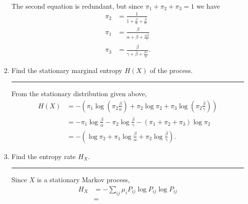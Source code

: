 \documentclass{article}
\newcommand{\horline}
           {\begin{center}
              \noindent\rule{8cm}{0.4pt}
            \end{center}}
\begin{document}
\begin{enumerate}[label=(\alph*)]
{\begin{align*}
        \end{align*}
        The second equation is redundant, but since 
         $\pi_1 + \pi_2 + \pi_3 = 1$ we have
        \begin{align*}
        \pi_2 &= \frac{1}{1 + \frac{\beta}{\alpha} 
                 + \frac{\overline{\beta}}{\alpha}}\\
        \pi_1 &= \frac{\beta}{\alpha + \beta 
                 + \frac{\alpha\overline{\beta}}{\gamma}}\\
        \pi_3 &= \frac{\overline{\beta}}{\gamma + \overline{\beta}
                 + \frac{\beta \gamma}{\alpha}}.
        \end{align*}
       }
  \item{Find the stationary marginal entropy $H(X)$ of the process.
       \horline
       From the stationary distribution given above,
       \begin{align*}
       H(X) &= -\left(\pi_1 \log \left(\pi_2 \frac{\beta}{\alpha}\right)
         + \pi_2 \log \pi_2 
         + \pi_3 \log \left(\pi_2 \frac{\overline{\beta}}{\gamma}\right)
               \right) \\
            &= -\pi_1 \log \frac{\beta}{\alpha} 
               -\pi_2 \log \frac{\overline{\beta}}{\gamma}
               -(\pi_1 + \pi_2 + \pi_3)\log \pi_2 \\
            &= -\left(\log \pi_2 + \pi_1\log\frac{\beta}{\alpha}
                                 + \pi_2\log\frac{\overline{\beta}}{\gamma}
                \right).
       \end{align*}
       }
  \item{Find the entropy rate $H_X$.
       \horline
       Since $X$ is a stationary Markov process,
       \begin{align*}
         H_X &= -\sum_{ij} \mu_i P_{ij} \log P_{ij} \log P_{ij} \\
             &= 
       \end{align*}
       }
\end{enumerate}
\end{document}
